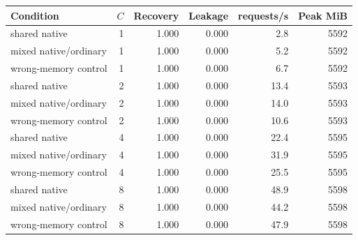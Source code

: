 \begin{tabular}{lrrrrr}
\toprule
Condition & $C$ & Recovery & Leakage & requests/s & Peak MiB \\
\midrule
shared native & 1 & 1.000 & 0.000 & 2.8 & 5592 \\
mixed native/ordinary & 1 & 1.000 & 0.000 & 5.2 & 5592 \\
wrong-memory control & 1 & 1.000 & 0.000 & 6.7 & 5592 \\
shared native & 2 & 1.000 & 0.000 & 13.4 & 5593 \\
mixed native/ordinary & 2 & 1.000 & 0.000 & 14.0 & 5593 \\
wrong-memory control & 2 & 1.000 & 0.000 & 10.6 & 5593 \\
shared native & 4 & 1.000 & 0.000 & 22.4 & 5595 \\
mixed native/ordinary & 4 & 1.000 & 0.000 & 31.9 & 5595 \\
wrong-memory control & 4 & 1.000 & 0.000 & 25.5 & 5595 \\
shared native & 8 & 1.000 & 0.000 & 48.9 & 5598 \\
mixed native/ordinary & 8 & 1.000 & 0.000 & 44.2 & 5598 \\
wrong-memory control & 8 & 1.000 & 0.000 & 47.9 & 5598 \\
\bottomrule
\end{tabular}
